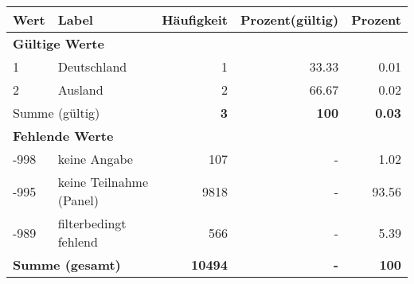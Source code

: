      \begin{longtable}{lXrrr}
     \toprule
     \textbf{Wert} & \textbf{Label} & \textbf{Häufigkeit} & \textbf{Prozent(gültig)} & \textbf{Prozent} \\
     \endhead
     \midrule
     \multicolumn{5}{l}{\textbf{Gültige Werte}}\\

     1 &
     \multicolumn{1}{X}{ Deutschland   } &


       \num{1} &
       \num[round-mode=places,round-precision=2]{33,33} &
         \num[round-mode=places,round-precision=2]{0,01} \\

     2 &
     \multicolumn{1}{X}{ Ausland   } &


       \num{2} &
       \num[round-mode=places,round-precision=2]{66,67} &
         \num[round-mode=places,round-precision=2]{0,02} \\
     \midrule
     \multicolumn{2}{l}{Summe (gültig)} &
       \textbf{\num{3}} &
     \textbf{100} &
       \textbf{\num[round-mode=places,round-precision=2]{0,03}} \\
     \multicolumn{5}{l}{\textbf{Fehlende Werte}}\\
       -998 &
       keine Angabe &
         \num{107} &
        - &
         \num[round-mode=places,round-precision=2]{1,02} \\
       -995 &
       keine Teilnahme (Panel) &
         \num{9818} &
        - &
         \num[round-mode=places,round-precision=2]{93,56} \\
       -989 &
       filterbedingt fehlend &
         \num{566} &
        - &
         \num[round-mode=places,round-precision=2]{5,39} \\
     \midrule
     \multicolumn{2}{l}{\textbf{Summe (gesamt)}} &
          \textbf{\num{10494}} &
        \textbf{-} &
        \textbf{100} \\
     \bottomrule
     \end{longtable}
     
